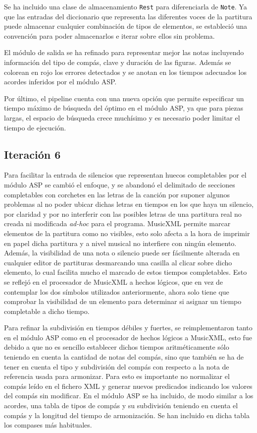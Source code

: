 Se ha incluido una clase de almacenamiento \texttt{Rest} para diferenciarla de \texttt{Note}. Ya que las entradas del diccionario que representa las diferentes voces de la partitura puede almacenar cualquier combinación de tipos de elementos, se estableció una convención para poder almacenarlos e iterar sobre ellos sin problema.

El módulo de salida se ha refinado para representar mejor las notas incluyendo información del tipo de compás, clave y duración de las figuras. Además se colorean en rojo los errores detectados y se anotan en los tiempos adecuados los acordes inferidos por el módulo ASP.

Por último, el pipeline cuenta con una nueva opción que permite especificar un tiempo máximo de búsqueda del óptimo en el módulo ASP, ya que para piezas largas, el espacio de búsqueda crece muchísimo y es necesario poder limitar el tiempo de ejecución.

\subsection{Iteración 6}
\label{sec:sixth_iteration}

Para facilitar la entrada de silencios que representan huecos completables por el módulo ASP se cambió el enfoque, y se abandonó el delimitado de secciones completables con corchetes en las letras de la canción por suponer algunos problemas al no poder ubicar dichas letras en tiempos en los que haya un silencio, por claridad y por no interferir con las posibles letras de una partitura real no creada ni modificada \textit{ad-hoc} para el programa. MusicXML permite marcar elementos de la partitura como no visibles, esto solo afecta a la hora de imprimir en papel dicha partitura y a nivel musical no interfiere con ningún elemento. Además, la visibilidad de una nota o silencio puede ser fácilmente alterada en cualquier editor de partituras desmarcando una casilla al clicar sobre dicho elemento, lo cual facilita mucho el marcado de estos tiempos completables. Esto se reflejó en el procesador de MusicXML a hechos lógicos, que en vez de contemplar los dos símbolos utilizados anteriormente, ahora solo tiene que comprobar la visibilidad de un elemento para determinar si asignar un tiempo completable a dicho tiempo.

Para refinar la subdivisión en tiempos débiles y fuertes, se reimplementaron tanto en el módulo ASP como en el procesador de hechos lógicos a MusicXML, esto fue debido a que no es sencillo establecer dichos tiempos aritméticamente sólo teniendo en cuenta la cantidad de notas del compás, sino que también se ha de tener en cuenta el tipo y subdivisión del compás con respecto a la nota de referencia usada para armonizar. Para esto es importante no normalizar el compás leído en el fichero XML y generar nuevos predicados indicando los valores del compás sin modificar. En el módulo ASP se ha incluido, de modo similar a los acordes, una tabla de tipos de compás y su subdivisión teniendo en cuenta el compás y la longitud del tiempo de armonización. Se han incluido en dicha tabla los compases más habituales. 

